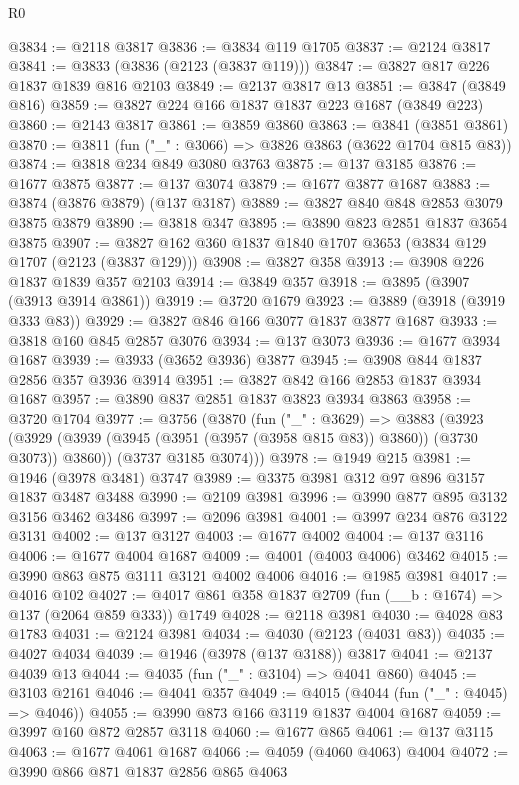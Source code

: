\begin{lexlean}{R0}
\begin{coremodule}
@3834 := @2118 @3817
@3836 := @3834 @119 @1705
@3837 := @2124 @3817
@3841 := @3833 (@3836 (@2123 (@3837 @119)))
@3847 := @3827 @817 @226 @1837 @1839 @816 @2103
@3849 := @2137 @3817 @13
@3851 := @3847 (@3849 @816)
@3859 := @3827 @224 @166 @1837 @1837 @223 @1687 (@3849 @223)
@3860 := @2143 @3817
@3861 := @3859 @3860
@3863 := @3841 (@3851 @3861)
@3870 := @3811 (fun ("_" : @3066) => @3826 @3863 (@3622 @1704 @815 @83))
@3874 := @3818 @234 @849 @3080 @3763
@3875 := @137 @3185
@3876 := @1677 @3875
@3877 := @137 @3074
@3879 := @1677 @3877 @1687
@3883 := @3874 (@3876 @3879) (@137 @3187)
@3889 := @3827 @840 @848 @2853 @3079 @3875 @3879
@3890 := @3818 @347
@3895 := @3890 @823 @2851 @1837 @3654 @3875
@3907 := @3827 @162 @360 @1837 @1840 @1707 @3653 (@3834 @129 @1707 (@2123 (@3837 @129)))
@3908 := @3827 @358
@3913 := @3908 @226 @1837 @1839 @357 @2103
@3914 := @3849 @357
@3918 := @3895 (@3907 (@3913 @3914 @3861))
@3919 := @3720 @1679
@3923 := @3889 (@3918 (@3919 @333 @83))
@3929 := @3827 @846 @166 @3077 @1837 @3877 @1687
@3933 := @3818 @160 @845 @2857 @3076
@3934 := @137 @3073
@3936 := @1677 @3934 @1687
@3939 := @3933 (@3652 @3936) @3877
@3945 := @3908 @844 @1837 @2856 @357 @3936 @3914
@3951 := @3827 @842 @166 @2853 @1837 @3934 @1687
@3957 := @3890 @837 @2851 @1837 @3823 @3934 @3863
@3958 := @3720 @1704
@3977 := @3756
    (@3870
      (fun ("_" : @3629) =>
      @3883
        (@3923 (@3929 (@3939 (@3945 (@3951 (@3957 (@3958 @815 @83)) @3860)) (@3730 @3073)) @3860))
        (@3737 @3185 @3074)))
@3978 := @1949 @215
@3981 := @1946 (@3978 @3481) @3747
@3989 := @3375 @3981 @312 @97 @896 @3157 @1837 @3487 @3488
@3990 := @2109 @3981
@3996 := @3990 @877 @895 @3132 @3156 @3462 @3486
@3997 := @2096 @3981
@4001 := @3997 @234 @876 @3122 @3131
@4002 := @137 @3127
@4003 := @1677 @4002
@4004 := @137 @3116
@4006 := @1677 @4004 @1687
@4009 := @4001 (@4003 @4006) @3462
@4015 := @3990 @863 @875 @3111 @3121 @4002 @4006
@4016 := @1985 @3981
@4017 := @4016 @102
@4027 := @4017 @861 @358 @1837 @2709 (fun (__b : @1674) => @137 (@2064 @859 @333)) @1749
@4028 := @2118 @3981
@4030 := @4028 @83 @1783
@4031 := @2124 @3981
@4034 := @4030 (@2123 (@4031 @83))
@4035 := @4027 @4034
@4039 := @1946 (@3978 (@137 @3188)) @3817
@4041 := @2137 @4039 @13
@4044 := @4035 (fun ("_" : @3104) => @4041 @860)
@4045 := @3103 @2161
@4046 := @4041 @357
@4049 := @4015 (@4044 (fun ("_" : @4045) => @4046))
@4055 := @3990 @873 @166 @3119 @1837 @4004 @1687
@4059 := @3997 @160 @872 @2857 @3118
@4060 := @1677 @865
@4061 := @137 @3115
@4063 := @1677 @4061 @1687
@4066 := @4059 (@4060 @4063) @4004
@4072 := @3990 @866 @871 @1837 @2856 @865 @4063

\end{coremodule}
\end{lexlean}
